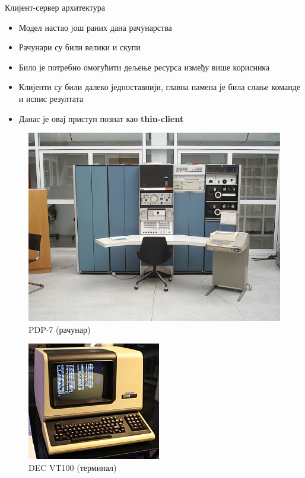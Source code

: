 \documentclass{beamer}
\begin{document}
    \begin{frame}[allowframebreaks]{Клијент-сервер архитектура}
        \begin{itemize}
            \item Модел настао још раних дана рачунарства
            \item Рачунари су били велики и скупи
            \item Било је потребно омогућити дељење ресурса између више корисника
            \item Клијенти су били далеко једноставнији, главна намена је била слање команде и испис резултата
            \item Данас је овај приступ познат као \textbf{thin-client}
        \end{itemize}
        
        \framebreak
        
        \begin{figure}
            \centering
            \includegraphics[height=\dimexpr \textheight - 4\baselineskip\relax]{images/pdp7.jpeg}
            \caption{PDP-7 (рачунар)}
            \label{fig:mainframe}
        \end{figure}
        
        \framebreak
        
        \begin{figure}
            \centering
            \includegraphics[height=\dimexpr \textheight - 4\baselineskip\relax]{images/DEC_VT100_terminal.jpg}
            \caption{DEC VT100 (терминал)}
            \label{fig:terminal}
        \end{figure}
        

\end{frame}
\end{document}

